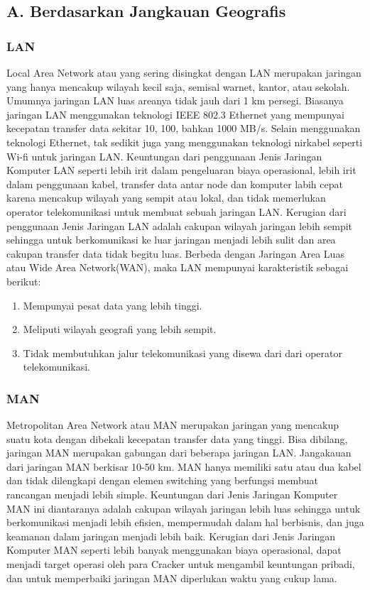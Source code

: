   \subsection{A. Berdasarkan Jangkauan Geografis}
    \subsubsection{LAN} 
      Local Area Network atau yang sering disingkat dengan LAN merupakan jaringan yang hanya mencakup wilayah kecil saja, semisal warnet, kantor, atau sekolah. Umumnya jaringan LAN luas areanya tidak jauh dari 1 km persegi.
    Biasanya jaringan LAN menggunakan teknologi IEEE 802.3 Ethernet yang mempunyai kecepatan transfer data sekitar 10, 100, bahkan 1000 MB/s. Selain menggunakan teknologi Ethernet, tak sedikit juga yang menggunakan teknologi nirkabel seperti Wi-fi untuk jaringan LAN.
    Keuntungan dari penggunaan Jenis Jaringan Komputer LAN seperti lebih irit dalam pengeluaran biaya operasional, lebih irit dalam penggunaan kabel, transfer data antar node dan komputer labih cepat karena mencakup wilayah yang sempit atau lokal, dan tidak memerlukan operator telekomunikasi untuk membuat sebuah jaringan LAN.
    Kerugian dari penggunaan Jenis Jaringan LAN adalah cakupan wilayah jaringan lebih sempit sehingga untuk berkomunikasi ke luar jaringan menjadi lebih sulit dan area cakupan transfer data tidak begitu luas.
    Berbeda dengan Jaringan Area Luas atau Wide Area Network(WAN), maka LAN mempunyai karakteristik sebagai berikut:
    \begin{enumerate}
    \item Mempunyai pesat data yang lebih tinggi.
    \item Meliputi wilayah geografi yang lebih sempit.
    \item Tidak membutuhkan jalur telekomunikasi yang disewa dari dari operator telekomunikasi.
    \end{enumerate}
    \subsubsection{MAN}
      Metropolitan Area Network atau MAN merupakan jaringan yang mencakup suatu kota dengan dibekali kecepatan transfer data yang tinggi. Bisa dibilang, jaringan MAN merupakan gabungan dari beberapa jaringan LAN.
    Jangakauan dari jaringan MAN berkisar 10-50 km. MAN hanya memiliki satu atau dua kabel dan tidak dilengkapi dengan elemen switching yang berfungsi membuat rancangan menjadi lebih simple.
    Keuntungan dari Jenis Jaringan Komputer MAN ini diantaranya adalah cakupan wilayah jaringan lebih luas sehingga untuk berkomunikasi menjadi lebih efisien, mempermudah dalam hal berbisnis, dan juga keamanan dalam jaringan menjadi lebih baik.
    Kerugian dari Jenis Jaringan Komputer MAN seperti lebih banyak menggunakan biaya operasional, dapat menjadi target operasi oleh para Cracker untuk mengambil keuntungan pribadi, dan untuk memperbaiki jaringan MAN diperlukan waktu yang cukup lama.
